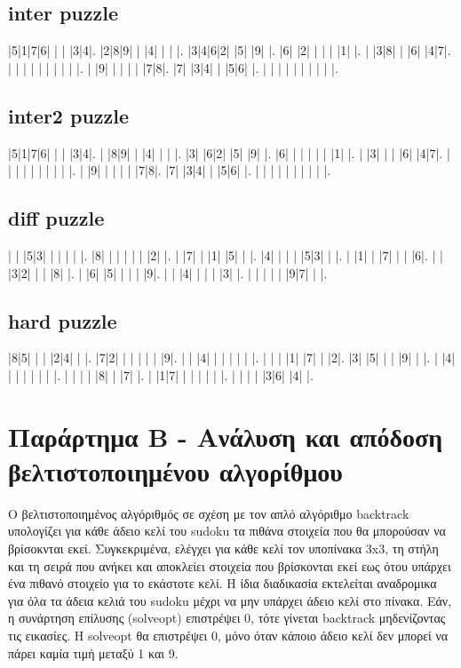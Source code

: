 \documentclass[a4paper,12pt]{article}
\begin{document}
\subsection{inter puzzle}

\begin{sudoku}
|5|1|7|6| | | |3|4|.
|2|8|9| | |4| | | |.
|3|4|6|2| |5| |9| |.
|6| |2| | | | |1| |.
| |3|8| | |6| |4|7|.
| | | | | | | | | |.
| |9| | | | | |7|8|.
|7| |3|4| | |5|6| |.
| | | | | | | | | |.
\end{sudoku}


\subsection{inter2 puzzle}

\begin{sudoku}
|5|1|7|6| | | |3|4|.
| |8|9| | |4| | | |.
|3| |6|2| |5| |9| |.
|6| | | | | | |1| |.
| |3| | | |6| |4|7|.
| | | | | | | | | |.
| |9| | | | | |7|8|.
|7| |3|4| | |5|6| |.
| | | | | | | | | |.
\end{sudoku}


\subsection{diff puzzle}

\begin{sudoku}
| | |5|3| | | | | |.
|8| | | | | | |2| |.
| |7| | |1| |5| | |.
|4| | | | |5|3| | |.
| |1| | |7| | | |6|.
| | |3|2| | | |8| |.
| |6| |5| | | | |9|.
| | |4| | | | |3| |.
| | | | | |9|7| | |.
\end{sudoku}


\subsection{hard puzzle}

\begin{sudoku}
|8|5| | | |2|4| | |.
|7|2| | | | | | |9|.
| | |4| | | | | | |.
| | | |1| |7| | |2|.
|3| |5| | | |9| | |.
| |4| | | | | | | |.
| | | | |8| | |7| |.
| |1|7| | | | | | |.
| | | | |3|6| |4| |.
\end{sudoku}


\section{Παράρτημα B - Ανάλυση και απόδοση βελτιστοποιημένου αλγορίθμου} \label{section:algorithm_opt_analysis}
Ο βελτιστοποιημένος αλγόριθμός σε σχέση με τον απλό αλγόριθμο backtrack υπολογίζει για κάθε άδειο κελί του sudoku τα πιθάνα στοιχεία που θα μπορούσαν να βρίσοκνται εκεί. Συγκεκριμένα, ελέγχει για κάθε κελί τον υποπίνακα 3x3, τη στήλη και τη σειρά που ανήκει και αποκλείει στοιχεία που βρίσκονται εκεί εως ότου υπάρχει ένα πιθανό στοιχείο για το εκάστοτε κελί. Η ίδια διαδικασία εκτελείται αναδρομικα για όλα τα άδεια κελιά του sudoku μέχρι να μην υπάρχει άδειο κελί στο πίνακα. Εάν, η συνάρτηση επίλυσης (solve\textunderscore opt) επιστρέψει 0, τότε γίνεται backtrack μηδενίζοντας τις εικασίες. Η solve\textunderscore opt θα επιστρέψει 0, μόνο όταν κάποιο άδειο κελί δεν μπορεί να πάρει καμία τιμή μεταξύ 1 και 9.\\
\end{document}
